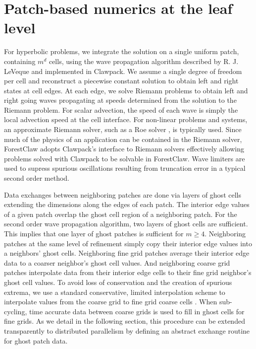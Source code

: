 \documentclass{IOS-Book-Article}     %
\newcommand{\comment}[1]{\textcolor{green}{[DAC: #1]}\xspace}
\newcommand{\clawpack}{{\sc Clawpack}\xspace}
\newcommand{\forestclaw}{ForestClaw\xspace}
\newcommand{\pforest}{\texttt{p4est}\xspace}
\newcommand{\ignore}[1]{}
\begin{document}


\section{Patch-based numerics at the leaf level}


For hyperbolic problems, we integrate the solution on a single uniform patch,
containing $m^d$ cells, using the wave propagation algorithm described by R. J.
LeVeque \cite{LeVeque:1997eg} and implemented in \clawpack \cite{le:2002,
clawpack}.  We assume a single degree of freedom per cell and reconstruct a
piecewise constant solution to obtain left and right states at cell edges.  At
each edge, we solve Riemann problems to obtain left and right going waves
propagating at speeds determined from the solution to the Riemann problem.  For
scalar advection, the speed of each wave is simply the local advection speed at
the cell interface.  For non-linear problems and systems, an approximate
Riemann solver, such as a Roe solver \cite{roesolver}, is typically used.  Since
much of the physics of an application can be contained in the Riemann solver,
\forestclaw adopts \clawpack's interface to Riemann solvers effectively allowing
problems solved with \clawpack to be solvable in \forestclaw.  Wave limiters
are used to supress spurious oscillations resulting from truncation error in a typical
second order method.
\ignore{In order to
achieve second order accuracy wave limiters are used to suppress spurious
oscillations at sharp gradients in the flow.}

Data exchanges between neighboring patches are done via layers of
ghost cells extending the dimensions along the edges of each patch.
The interior edge values of a given patch overlap the ghost cell
region of a neighboring patch.  For the second order wave propagation
algorithm, two layers of ghost cells are sufficient.  This implies that
one layer of ghost patches is sufficient for $m \ge 4$.  Neighboring
patches at the same level of refinement simply copy their interior
edge values into a neighbors' ghost cells.  Neighboring fine grid
patches average their interior edge data to a coarser neighbor's ghost
cell values.  And neighboring coarse grid patches interpolate data
from their interior edge cells to their fine grid neighbor's ghost
cell values.  To avoid loss of conservation and the creation of
spurious extrema, we use a standard conservative, limited
interpolation scheme to interpolate values from the coarse grid to
fine grid coarse cells \cite{amrclaw, chombo}.  When sub-cycling, time accurate
data between coarse grids is used to fill in ghost cells for fine grids.
As we detail in the following section, this procedure can be extended
transparently to distributed parallelism by defining an abstract exchange
routine for ghost patch data.
\end{document}
